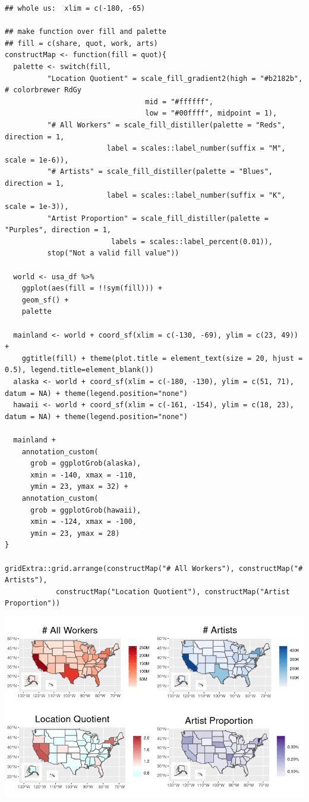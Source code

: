 \documentclass[8pt]{article}
\begin{document}
\begin{verbatim}
## whole us:  xlim = c(-180, -65)

## make function over fill and palette
## fill = c(share, quot, work, arts)
constructMap <- function(fill = quot){
  palette <- switch(fill,
		  "Location Quotient" = scale_fill_gradient2(high = "#b2182b", # colorbrewer RdGy
							     mid = "#ffffff",
							     low = "#00ffff", midpoint = 1),
		  "# All Workers" = scale_fill_distiller(palette = "Reds", direction = 1,
						label = scales::label_number(suffix = "M", scale = 1e-6)),
		  "# Artists" = scale_fill_distiller(palette = "Blues", direction = 1,
						label = scales::label_number(suffix = "K", scale = 1e-3)),
		  "Artist Proportion" = scale_fill_distiller(palette = "Purples", direction = 1,
						 labels = scales::label_percent(0.01)),
		  stop("Not a valid fill value"))

  world <- usa_df %>%
    ggplot(aes(fill = !!sym(fill))) +
    geom_sf() +
    palette

  mainland <- world + coord_sf(xlim = c(-130, -69), ylim = c(23, 49)) +
    ggtitle(fill) + theme(plot.title = element_text(size = 20, hjust = 0.5), legend.title=element_blank())
  alaska <- world + coord_sf(xlim = c(-180, -130), ylim = c(51, 71), datum = NA) + theme(legend.position="none")
  hawaii <- world + coord_sf(xlim = c(-161, -154), ylim = c(18, 23), datum = NA) + theme(legend.position="none")

  mainland +
    annotation_custom(
      grob = ggplotGrob(alaska),
      xmin = -140, xmax = -110,
      ymin = 23, ymax = 32) +
    annotation_custom(
      grob = ggplotGrob(hawaii),
      xmin = -124, xmax = -100,
      ymin = 23, ymax = 28)
}

gridExtra::grid.arrange(constructMap("# All Workers"), constructMap("# Artists"),
			constructMap("Location Quotient"), constructMap("Artist Proportion"))
\end{verbatim}

\begin{center}
\includegraphics[width=.9\linewidth]{media/gis_vars.png}
\end{center}
\end{document}
